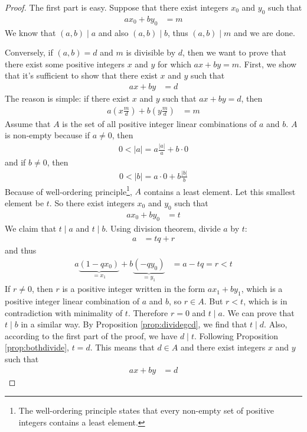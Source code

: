 \documentclass{subfile}
\begin{document}
	\begin{proof}
		The first part is easy. Suppose that there exist integers $x_0$ and $y_0$ such that
		\begin{align*}
			ax_0 + by_0
				& = m
		\end{align*}
		We know that $(a,b)\mid a$ and also $(a,b)\mid b$, thus $(a,b)\mid m$ and we are done.

		Conversely, if $(a,b)=d$ and $m$ is divisible by $d$, then we want to prove that there exist some positive integers $x$ and $y$ for which $ax+by=m$. First, we show that it's sufficient to show that there exist $x$ and $y$ such that
		\begin{align*}
			ax + by
				& = d
		\end{align*}
		The reason is simple: if there exist $x$ and $y$ such that $ax + by = d$, then
		\begin{align*}
			a\left( x \frac{m}{d} \right)  + b \left( y \frac{m}{d} \right)
				& = m
		\end{align*}
		Assume that $A$ is the set of all positive integer linear combinations of $a$ and $b$. $A$ is non-empty because if $a \neq 0$, then
		\begin{align*}
			0<|a| = a\frac{|a|}{a} + b\cdot 0
		\end{align*}
		and if $b \neq 0$, then
		\begin{align*}	0<|b| =  a\cdot 0 + b \frac{|b|}{b}\end{align*}
		Because of well-ordering principle\footnote{The well-ordering principle states that every non-empty set of positive integers contains a least element.}, $A$ contains a least element. Let this smallest element be $t$. So there exist integers $x_0$ and $y_0$ such that
			\begin{align*}
				ax_0 + by_0
					& = t
			\end{align*}
		We claim that $t\mid a$ and $t\mid b$. Using division theorem, divide $a$ by $t$:
			\begin{align*}
				a
					& = tq+r
			\end{align*}
		and thus
			\begin{align*}
				a\underbrace{(1-qx_0)}_{=x_1}+b\underbrace{(-qy_0)}_{=y_1}
					& =a-tq=r<t
			\end{align*}
		If $r \neq 0$, then $r$ is a positive integer written in the form $ax_1+by_1$, which is a positive integer linear combination of $a$ and $b$, so $r \in A$. But $r<t$, which is in contradiction with minimality of $t$. Therefore $r=0$ and $t\mid a$. We can prove that $t\mid b$ in a similar way. By Proposition \ref{prop:dividegcd}, we find that $t\mid d$. Also, according to the first part of the proof, we have $d\mid t$. Following Proposition \ref{prop:bothdivide}, $t=d$. This means that $d \in A$ and there exist integers $x$ and $y$ such that
		\begin{align*}
			ax + by
				& = d
		\end{align*}
	\end{proof}
\end{document}
